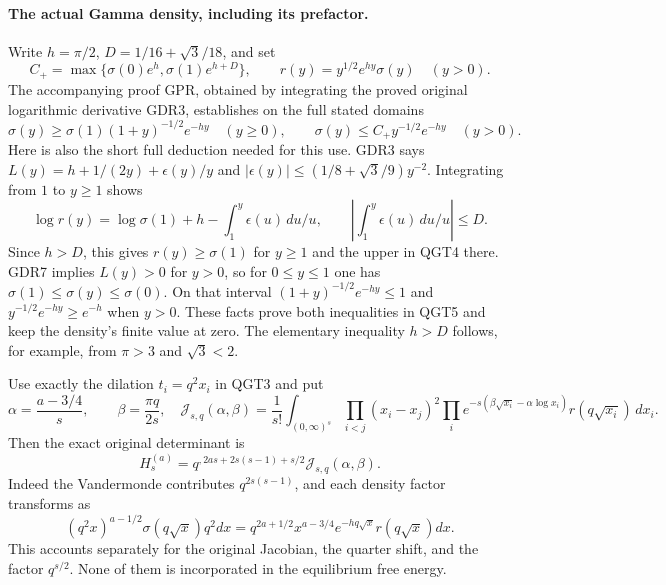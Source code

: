 \paragraph{The actual Gamma density, including its prefactor.}
Write $h=\pi/2$, $D=1/16+\sqrt3/18$, and set
\[
 C_+=\max\{\sigma(0)e^h,\sigma(1)e^{h+D}\},
 \qquad r(y)=y^{1/2}e^{hy}\sigma(y)\quad(y>0).
 \tag{QGT4}
\]
The accompanying proof GPR, obtained by integrating the proved original
logarithmic derivative GDR3, establishes on the full stated domains
\[
 \sigma(y)\ge\sigma(1)(1+y)^{-1/2}e^{-hy}\quad(y\ge0),
 \qquad \sigma(y)\le C_+y^{-1/2}e^{-hy}\quad(y>0).
 \tag{QGT5}
\]
Here is also the short full deduction needed for this use. GDR3 says
$L(y)=h+1/(2y)+\epsilon(y)/y$ and
$|\epsilon(y)|\le(1/8+\sqrt3/9)y^{-2}$. Integrating from $1$ to
$y\ge1$ shows
\[
 \log r(y)=\log\sigma(1)+h-\int_1^y\epsilon(u)\,du/u,
 \qquad \left|\int_1^y\epsilon(u)\,du/u\right|\le D.
\]
Since $h>D$, this gives $r(y)\ge\sigma(1)$ for $y\ge1$ and the
upper in QGT4 there. GDR7 implies $L(y)>0$ for $y>0$, so for
$0\le y\le1$ one has $\sigma(1)\le\sigma(y)\le\sigma(0)$.
On that interval $(1+y)^{-1/2}e^{-hy}\le1$ and
$y^{-1/2}e^{-hy}\ge e^{-h}$ when $y>0$. These facts prove both
inequalities in QGT5 and keep the density's finite value at zero.
The elementary inequality $h>D$ follows, for example, from
$\pi>3$ and $\sqrt3<2$.

Use exactly the dilation $t_i=q^2x_i$ in QGT3 and put
\[
 \alpha=\frac{a-3/4}{s},\qquad \beta=\frac{\pi q}{2s},
 \quad
 \mathcal J_{s,q}(\alpha,\beta)=\frac1{s!}
 \int_{(0,\infty)^s}\prod_{i<j}(x_i-x_j)^2
 \prod_i e^{-s(\beta\sqrt{x_i}-\alpha\log x_i)}
                     r(q\sqrt{x_i})\,dx_i.
 \tag{QGT6}
\]
Then the exact original determinant is
\[
 \boxed{H_s^{(a)}
   =q^{,2as+2s(s-1)+s/2}\mathcal J_{s,q}(\alpha,\beta).}
 \tag{QGT7}
\]
Indeed the Vandermonde contributes $q^{2s(s-1)}$, and each density
factor transforms as
\[
 (q^2x)^{a-1/2}\sigma(q\sqrt x)q^2dx
 =q^{2a+1/2}x^{a-3/4}e^{-hq\sqrt x}r(q\sqrt x)dx.
\]
This accounts separately for the original Jacobian, the quarter shift,
and the factor $q^{s/2}$. None of them is incorporated in the
equilibrium free energy.

